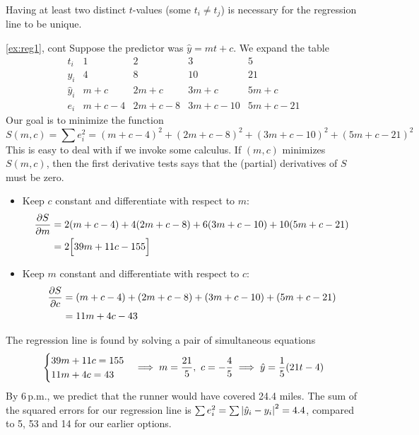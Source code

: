 Having at least two distinct $t$-values (some $t_i\neq t_j$) is necessary for the regression line to be unique.

\begin{example*}{\ref{ex:reg1}, cont}{}
	Suppose the predictor was $\hat y=mt+c$. We expand the table
	\[
		\begin{array}{c|ccccc}
			t_i&1&2&3&5\\\hline
			y_i&4&8&10&21\\\hline
		\hat y_i&m+c&2m+c&3m+c&5m+c\\\hline
		e_i&m+c-4&2m+c-8&3m+c-10&5m+c-21
		\end{array}
	\]
	Our goal is to minimize the function
	\[
		S(m,c) =\sum e_i^2= (m+c-4)^2 +(2m+c-8)^2 +(3m+c-10)^2 +(5m+c-21)^2
	\]
	This is easy to deal with if we invoke some calculus. If $(m,c)$ minimizes $S(m,c)$, then the first derivative tests says that the (partial) derivatives of $S$ must be zero.%
	\begin{itemize}\itemsep0pt
	  \item Keep $c$ constant and differentiate with respect to $m$:
	  \begin{align*}
			\partials[S]{m} &=2(m+c-4) +4(2m+c-8) +6(3m+c-10) +10(5m+c-21)\\
			&=2\Bigl[39m+11c-155\Bigr]
		\end{align*}
		\item Keep $m$ constant and differentiate with respect to $c$:
	  \begin{align*}
			\partials[S]{c} &=(m+c-4) +(2m+c-8) +(3m+c-10) +(5m+c-21)\\
			&=11m+4c-43
		\end{align*}
	\end{itemize}
	The regression line is found by solving a pair of simultaneous equations
	\[
		\begin{cases}
			39m+11c=155\\
			11m+4c=43
		\end{cases}
		\negthickspace\implies 
	m=\frac{21}{5},\ c=-\frac{4}{5} \implies \hat y=\frac 1{5}(21t-4)
	\]
	By 6\,p.m., we predict that the runner would have covered 24.4 miles. The sum of the squared errors for our regression line is $\sum e_i^2=\sum\nm{\hat y_i-y_i}^2=4.4$, compared to 5, 53 and 14 for our earlier options.
\end{example*}


